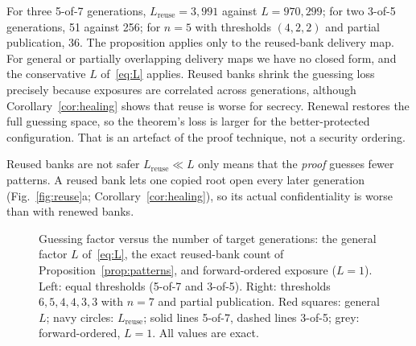 \documentclass[pdflatex,sn-mathphys-num]{sn-jnl}
\theoremstyle{plain}
\theoremstyle{definition}
\begin{document}
For three 5-of-7 generations, $L_{\mathrm{reuse}}=3{,}991$ against $L=970{,}299$; for two 3-of-5 generations, 51 against 256; for $n=5$ with thresholds $(4,2,2)$ and partial publication, 36. The proposition applies only to the reused-bank delivery map. For general or partially overlapping delivery maps we have no closed form, and the conservative $L$ of~\eqref{eq:L} applies. Reused banks shrink the guessing loss precisely because exposures are correlated across generations, although Corollary~\ref{cor:healing} shows that reuse is worse for secrecy. Renewal restores the full guessing space, so the theorem's loss is larger for the better-protected configuration. That is an artefact of the proof technique, not a security ordering.

\begin{warnbox}{Reused banks are not safer}
$L_{\mathrm{reuse}}\ll L$ only means that the \emph{proof} guesses fewer patterns. A reused bank lets one copied root open every later generation (Fig.~\ref{fig:reuse}a; Corollary~\ref{cor:healing}), so its actual confidentiality is worse than with renewed banks.
\end{warnbox}

\begin{figure}[t]
\centering

\caption{Guessing factor versus the number of target generations: the general factor $L$ of~\eqref{eq:L}, the exact reused-bank count of Proposition~\ref{prop:patterns}, and forward-ordered exposure ($L=1$). Left: equal thresholds (5-of-7 and 3-of-5). Right: thresholds $6,5,4,4,3,3$ with $n=7$ and partial publication. Red squares: general $L$; navy circles: $L_{\mathrm{reuse}}$; solid lines 5-of-7, dashed lines 3-of-5; grey: forward-ordered, $L=1$. All values are exact.}\label{fig:guess}
\end{figure}
\end{document}
